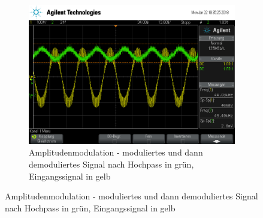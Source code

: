\begin{figure}[t!]
\begin{subfigure}[t]{0.5\textwidth}
		\includegraphics[width=\textwidth]{img/h_scope_237.png}
		\caption{Amplitudenmodulation - moduliertes und dann demoduliertes Signal nach Hochpass in grün, Eingangssignal in gelb}
	\end{subfigure}
\end{figure}

\FloatBarrier
